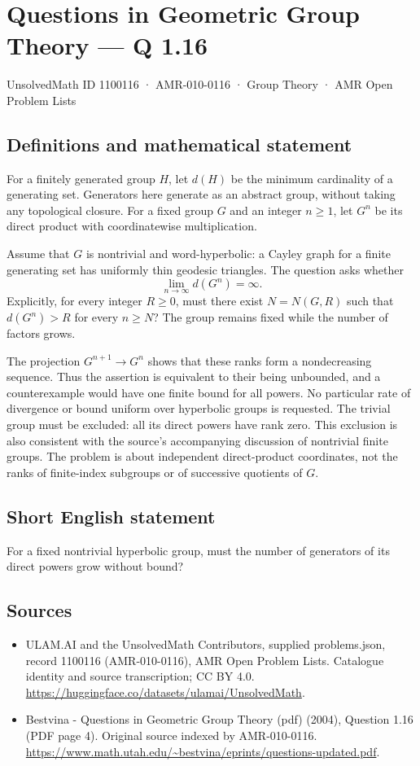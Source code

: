 \documentclass[11pt,a4paper]{article}
\begin{document}
\section*{Questions in Geometric Group Theory — Q 1.16}\label{1100116}
{\small UnsolvedMath ID 1100116 · AMR-010-0116 · Group Theory · AMR Open Problem Lists}
\subsection{Definitions and mathematical statement}
For a finitely generated group $H$, let $d(H)$ be the minimum cardinality of a generating set. Generators here generate as an abstract group, without taking any topological closure. For a fixed group $G$ and an integer $n\geq1$, let $G^n$ be its direct product with coordinatewise multiplication.

Assume that $G$ is nontrivial and word-hyperbolic: a Cayley graph for a finite generating set has uniformly thin geodesic triangles. The question asks whether
\[
 \lim_{n\to\infty}d(G^n)=\infty.
\]
Explicitly, for every integer $R\geq0$, must there exist $N=N(G,R)$ such that $d(G^n)>R$ for every $n\geq N$? The group remains fixed while the number of factors grows.

The projection $G^{n+1}\to G^n$ shows that these ranks form a nondecreasing sequence. Thus the assertion is equivalent to their being unbounded, and a counterexample would have one finite bound for all powers. No particular rate of divergence or bound uniform over hyperbolic groups is requested. The trivial group must be excluded: all its direct powers have rank zero. This exclusion is also consistent with the source's accompanying discussion of nontrivial finite groups. The problem is about independent direct-product coordinates, not the ranks of finite-index subgroups or of successive quotients of $G$.
\subsection{Short English statement}
For a fixed nontrivial hyperbolic group, must the number of generators of its direct powers grow without bound?
\subsection{Sources}
\begin{itemize}
\item[S1] ULAM.AI and the UnsolvedMath Contributors, supplied problems.json, record 1100116 (AMR-010-0116), AMR Open Problem Lists. Catalogue identity and source transcription; CC BY 4.0.
\url{https://huggingface.co/datasets/ulamai/UnsolvedMath}.
\item[S2] Bestvina - Questions in Geometric Group Theory (pdf) (2004), Question 1.16 (PDF page 4). Original source indexed by AMR-010-0116.
\url{https://www.math.utah.edu/~bestvina/eprints/questions-updated.pdf}.
\end{itemize}
\end{document}
